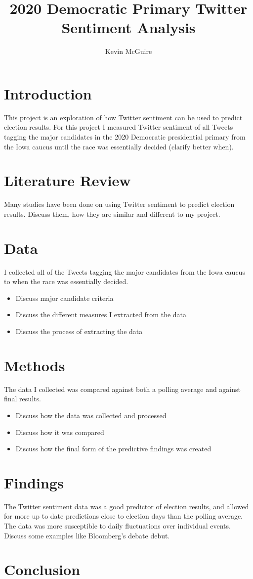 \documentclass [11pt]{article}
\title{2020 Democratic Primary Twitter Sentiment Analysis}
\author{Kevin McGuire}
\begin{document}
\maketitle

\section{Introduction}
This project is an exploration of how Twitter sentiment can be used to predict election results. For this project I measured Twitter sentiment of all Tweets tagging the major candidates in the 2020 Democratic presidential primary from the Iowa caucus until the race was essentially decided (clarify better when).
\section{Literature Review}
Many studies have been done on using Twitter sentiment to predict election results. Discuss them, how they are similar and different to my project.

\section{Data}
I collected all of the Tweets tagging the major candidates from the Iowa caucus to when the race was essentially decided.
\begin{itemize}
    \item Discuss major candidate criteria
    \item Discuss the different measures I extracted from the data
    \item Discuss the process of extracting the data
\end{itemize}
\section{Methods}
The data I collected was compared against both a polling average and against final results. 
\begin{itemize}
    \item Discuss how the data was collected and processed
    \item Discuss how it was compared
    \item Discuss how the final form of the predictive findings was created
\end{itemize}
\section{Findings}
The Twitter sentiment data was a good predictor of election results, and allowed for more up to date predictions close to election days than the polling average. The data was more susceptible to daily fluctuations over individual events. Discuss some examples like Bloomberg's debate debut. 
\section{Conclusion}


\nocite{*}


\end{document}
